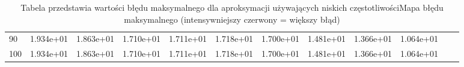 \begin{table}[h]
\begin{tabular}{|l|ccccccccccc||}
90 & \cellcolor{Red!70}1.934e+01 & \cellcolor{Red!67}1.863e+01 & \cellcolor{Red!60}1.710e+01 & \cellcolor{Red!60}1.711e+01 & \cellcolor{Red!61}1.718e+01 & \cellcolor{Red!60}1.700e+01 & \cellcolor{Red!50}1.481e+01 & \cellcolor{Red!45}1.366e+01 & \cellcolor{Red!31}1.064e+01 \\
100 & \cellcolor{Red!70}1.934e+01 & \cellcolor{Red!67}1.863e+01 & \cellcolor{Red!60}1.710e+01 & \cellcolor{Red!60}1.711e+01 & \cellcolor{Red!61}1.718e+01 & \cellcolor{Red!60}1.700e+01 & \cellcolor{Red!50}1.481e+01 & \cellcolor{Red!45}1.366e+01 & \cellcolor{Red!31}1.064e+01 \\
\hline
\end{tabular}
\caption{Tabela przedstawia wartości błędu maksymalnego dla aproksymacji używających niskich częstotliwościMapa błędu maksymalnego (intensywniejszy czerwony = większy błąd)}
\label{tab:smallValues}
\end{table}
